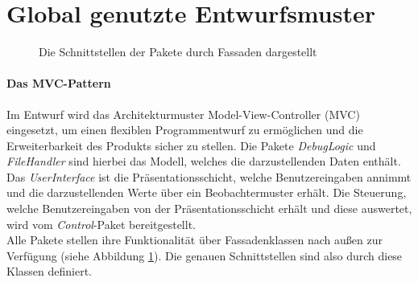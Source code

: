 \documentclass[parskip=full]{scrartcl}
\begin{document}
\section{Global genutzte Entwurfsmuster}
\label{GlobalePatterns}
\begin{figure}[!h]
\caption{Die Schnittstellen der Pakete durch Fassaden dargestellt}
\label{fig:fassaden}
\end{figure}
\paragraph{Das MVC-Pattern}
Im Entwurf wird das Architekturmuster Model-View-Controller (MVC) eingesetzt, um einen flexiblen Programmentwurf zu ermöglichen und die Erweiterbarkeit des Produkts sicher zu stellen. Die Pakete \textit{DebugLogic} und \textit{FileHandler} sind hierbei das Modell, welches die darzustellenden Daten enthält. Das \textit{UserInterface} ist die Präsentationsschicht, welche Benutzereingaben annimmt und die darzustellenden Werte über ein Beobachtermuster erhält. Die Steuerung, welche Benutzereingaben von der Präsentationsschicht erhält und diese auswertet, wird vom \textit{Control}-Paket bereitgestellt. \\
Alle Pakete stellen ihre Funktionalität über Fassadenklassen nach außen zur Verfügung (siehe Abbildung \ref{fig:fassaden}). Die genauen Schnittstellen sind also durch diese Klassen definiert.
\end{document}

